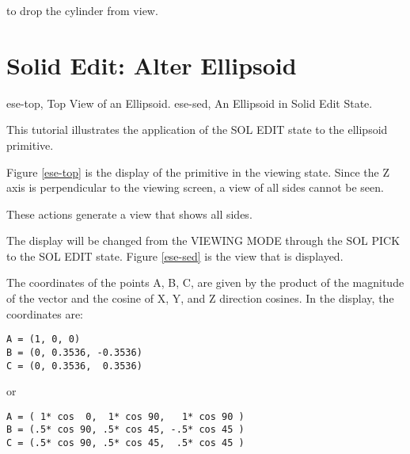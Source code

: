 
to drop the cylinder from view.

\section{Solid Edit: Alter Ellipsoid}
\mfig ese-top, Top View of an Ellipsoid.
\mfig ese-sed, An Ellipsoid in Solid Edit State.

This tutorial illustrates the application of the SOL EDIT state to the
ellipsoid primitive.


Figure \ref{ese-top} is the display of the primitive in the viewing state.
Since the
Z axis is perpendicular to the viewing screen, a view of all sides cannot be
seen.


These actions generate a view that shows all sides.


The display will be changed from the VIEWING MODE through the SOL PICK to
the SOL EDIT state.  Figure \ref{ese-sed} is the view that is displayed.

The coordinates of the points A, B, C, are given by the product of the
magnitude of the vector and the cosine of X, Y, and Z direction cosines.  In
the display, the coordinates are:

\begin{center}
\begin{verbatim}
A = (1, 0, 0)
B = (0, 0.3536, -0.3536)
C = (0, 0.3536,  0.3536)
\end{verbatim}
\end{center}
or
\begin{center}
\begin{verbatim}
A = ( 1* cos  0,  1* cos 90,   1* cos 90 )
B = (.5* cos 90, .5* cos 45, -.5* cos 45 )
C = (.5* cos 90, .5* cos 45,  .5* cos 45 )
\end{verbatim}
\end{center}

